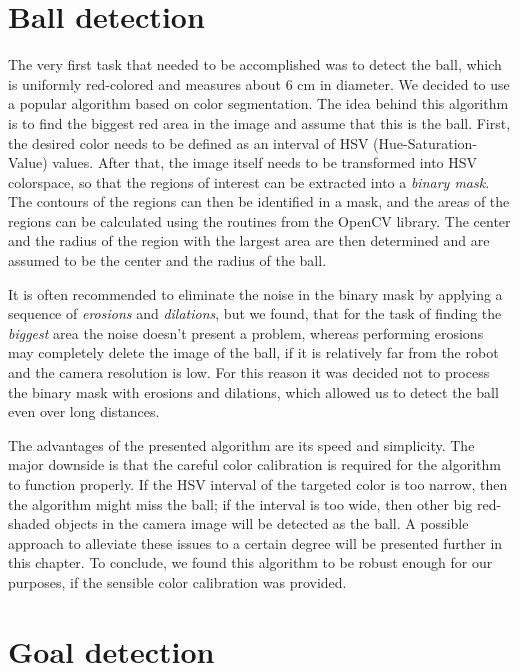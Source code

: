 \section{Ball detection}

The very first task that needed to be accomplished was to detect the ball,
which is uniformly red-colored and measures about 6 cm in diameter. We decided
to use a popular algorithm based on color segmentation. The idea behind this
algorithm is to find the biggest red area in the image and assume that this is
the ball. First, the desired color needs to be defined as an interval of HSV
(Hue-Saturation-Value) values. After that, the image itself needs to be
transformed into HSV colorspace, so that the regions of interest can be
extracted into a \textit{binary mask}. The contours of the regions can then be
identified in a mask, and the areas of the regions can be calculated using the
routines from the OpenCV library. The center and the radius of the region with
the largest area are then determined and are assumed to be the center and the
radius of the ball.

It is often recommended to eliminate the noise in the binary mask by applying a
sequence of \textit{erosions} and \textit{dilations}, but we found, that for
the task of finding the \textit{biggest} area the noise doesn't present a
problem, whereas performing erosions may completely delete the image of the
ball, if it is relatively far from the robot and the camera resolution is low.
For this reason it was decided not to process the binary mask with erosions and
dilations, which allowed us to detect the ball even over long distances.

The advantages of the presented algorithm are its speed and simplicity. The
major downside is that the careful color calibration is required for the
algorithm to function properly. If the HSV interval of the targeted color is
too narrow, then the algorithm might miss the ball; if the interval is too
wide, then other big red-shaded objects in the camera image will be detected as
the ball. A possible approach to alleviate these issues to a certain degree
will be presented further in this chapter. To conclude, we found this algorithm
to be robust enough for our purposes, if the sensible color calibration was
provided.

\section{Goal detection}

